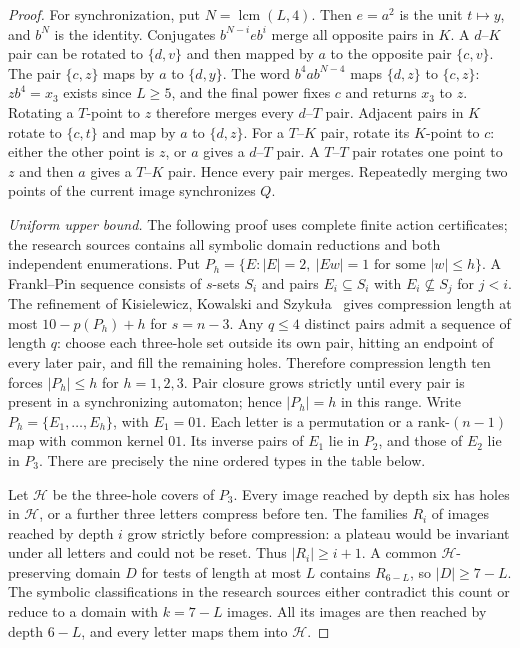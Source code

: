 \documentclass[10pt]{article}
\begin{document}
\begin{proof}
For synchronization, put $N=\operatorname{lcm}(L,4)$.
Then $e=a^2$ is the unit $t\mapsto y$, and $b^N$ is the identity.
Conjugates $b^{N-i}eb^i$ merge all opposite pairs in $K$.
A $d$--$K$ pair can be rotated to $\{d,v\}$ and then mapped by $a$ to the opposite pair $\{c,v\}$.
The pair $\{c,z\}$ maps by $a$ to $\{d,y\}$.
The word $b^4ab^{N-4}$ maps $\{d,z\}$ to $\{c,z\}$:
$zb^4=x_3$ exists since $L\ge5$, and the final power fixes $c$ and returns $x_3$ to $z$.
Rotating a $T$-point to $z$ therefore merges every $d$--$T$ pair.
Adjacent pairs in $K$ rotate to $\{c,t\}$ and map by $a$ to $\{d,z\}$.
For a $T$--$K$ pair, rotate its $K$-point to $c$: either the other point is $z$, or $a$ gives a $d$--$T$ pair.
A $T$--$T$ pair rotates one point to $z$ and then $a$ gives a $T$--$K$ pair.
Hence every pair merges. Repeatedly merging two points of the current image synchronizes $Q$.

\emph{Uniform upper bound.}
The following proof uses complete finite action certificates; the research sources
contains all symbolic domain reductions and both independent enumerations.
Put $P_h=\{E:|E|=2,\ |Ew|=1\text{ for some }|w|\le h\}$.
A Frankl--Pin sequence consists of $s$-sets $S_i$ and pairs
$E_i\subseteq S_i$ with $E_i\nsubseteq S_j$ for $j<i$.
The refinement of Kisielewicz, Kowalski and Szyku\l a~\cite[Theorem~1]{kisielewicz2016}
gives compression length at most $10-p(P_h)+h$ for $s=n-3$.
Any $q\le4$ distinct pairs admit a sequence of length $q$:
choose each three-hole set outside its own pair, hitting an endpoint
of every later pair, and fill the remaining holes.
Therefore compression length ten forces $|P_h|\le h$ for $h=1,2,3$.
Pair closure grows strictly until every pair is present in a synchronizing
automaton; hence $|P_h|=h$ in this range.
Write $P_h=\{E_1,\ldots,E_h\}$, with $E_1=01$.
Each letter is a permutation or a rank-$(n-1)$ map with common kernel $01$.
Its inverse pairs of $E_1$ lie in $P_2$, and those of $E_2$ lie in $P_3$.
There are precisely the nine ordered types in the table below.

Let $\mathcal H$ be the three-hole covers of $P_3$.
Every image reached by depth six has holes in $\mathcal H$, or a further
three letters compress before ten. The families $R_i$ of images reached
by depth $i$ grow strictly before compression: a plateau would be
invariant under all letters and could not be reset. Thus $|R_i|\ge i+1$.
A common $\mathcal H$-preserving domain $D$ for tests of length at most
$L$ contains $R_{6-L}$, so $|D|\ge7-L$.
The symbolic classifications in the research sources either contradict this
count or reduce to a domain with $k=7-L$ images.
All its images are then reached by depth $6-L$, and every letter maps
them into $\mathcal H$.


\end{proof}
\end{document}
